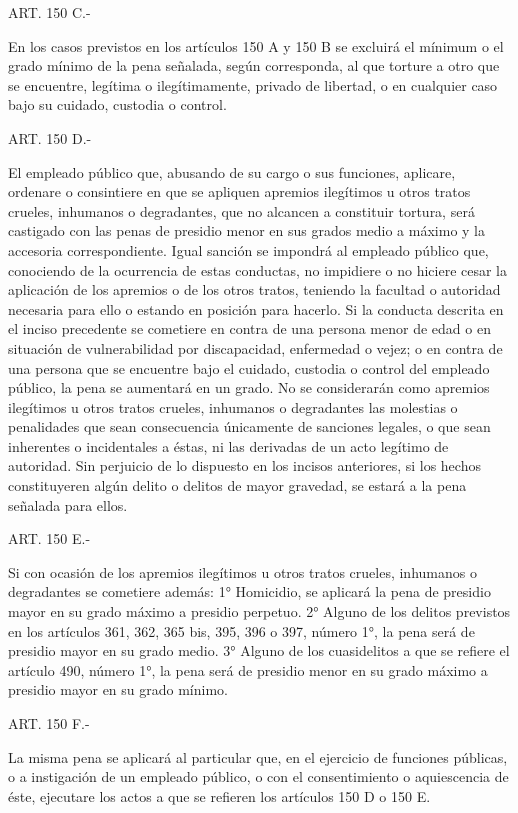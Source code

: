     ART. 150 C.-

    En los casos previstos en los artículos 150 A y 150 B se excluirá el mínimum o el grado mínimo de la pena señalada, según corresponda, al que torture a otro que se encuentre, legítima o ilegítimamente, privado de libertad, o en cualquier caso bajo su cuidado, custodia o control.

    ART. 150 D.-

    El empleado público que, abusando de su cargo o sus funciones, aplicare, ordenare o consintiere en que se apliquen apremios ilegítimos u otros tratos crueles, inhumanos o degradantes, que no alcancen a constituir tortura, será castigado con las penas de presidio menor en sus grados medio a máximo y la accesoria correspondiente. Igual sanción se impondrá al empleado público que, conociendo de la ocurrencia de estas conductas, no impidiere o no hiciere cesar la aplicación de los apremios o de los otros tratos, teniendo la facultad o autoridad necesaria para ello o estando en posición para hacerlo.
    Si la conducta descrita en el inciso precedente se cometiere en contra de una persona menor de edad o en situación de vulnerabilidad por discapacidad, enfermedad o vejez; o en contra de una persona que se encuentre bajo el cuidado, custodia o control del empleado público, la pena se aumentará en un grado.
    No se considerarán como apremios ilegítimos u otros tratos crueles, inhumanos o degradantes las molestias o penalidades que sean consecuencia únicamente de sanciones legales, o que sean inherentes o incidentales a éstas, ni las derivadas de un acto legítimo de autoridad.
    Sin perjuicio de lo dispuesto en los incisos anteriores, si los hechos constituyeren algún delito o delitos de mayor gravedad, se estará a la pena señalada para ellos.


    ART. 150 E.-

    Si con ocasión de los apremios ilegítimos u otros tratos crueles, inhumanos o degradantes se cometiere además:
    1° Homicidio, se aplicará la pena de presidio mayor en su grado máximo a presidio perpetuo.
    2° Alguno de los delitos previstos en los artículos 361, 362, 365 bis, 395, 396 o 397, número 1°, la pena será de presidio mayor en su grado medio.
    3° Alguno de los cuasidelitos a que se refiere el artículo 490, número 1°, la pena será de presidio menor en su grado máximo a presidio mayor en su grado mínimo.

    ART. 150 F.-

    La misma pena se aplicará al particular que, en el ejercicio de funciones públicas, o a instigación de un empleado público, o con el consentimiento o aquiescencia de éste, ejecutare los actos a que se refieren los artículos 150 D o 150 E.

